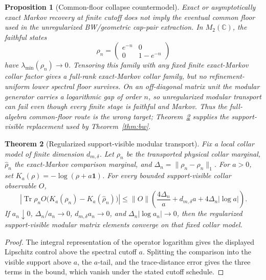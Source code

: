 \documentclass[11pt]{article}
\newtheorem{theorem}{Theorem}[section]
\newtheorem{proposition}[theorem]{Proposition}
\begin{document}
\begin{proposition}[Common-floor collapse countermodel]\label{prop:commonfloor-collapse}
Exact or asymptotically exact Markov recovery at finite cutoff does not imply the eventual common floor used in the unregularized BW/geometric cap-pair extraction. In \(M_2(\mathbb C)\), the faithful states
\[
\rho_n=\begin{pmatrix}e^{-n}&0\\0&1-e^{-n}\end{pmatrix}
\]
have \(\lambda_{\min}(\rho_n)\to0\). Tensoring this family with any fixed finite exact-Markov collar factor gives a full-rank exact-Markov collar family, but no refinement-uniform lower spectral floor survives. On an off-diagonal matrix unit the modular generator carries a logarithmic gap of order \(n\), so unregularized modular transport can fail even though every finite stage is faithful and Markov. Thus the full-algebra common-floor route is the wrong target; Theorem~\ref{thm:regularized-modular-transport} supplies the support-visible replacement used by Theorem~\ref{thm:bw}.
\end{proposition}

\begin{theorem}[Regularized support-visible modular transport]\label{thm:regularized-modular-transport}
Fix a local collar model of finite dimension \(d_{m,\delta}\). Let \(\rho_n\) be the transported physical collar marginal, \(\widehat\rho_n\) the exact-Markov comparison marginal, and \(\Delta_n=\|\rho_n-\widehat\rho_n\|_1\). For \(a>0\), set \(K_a(\rho)=-\log(\rho+a\mathbf 1)\). For every bounded support-visible collar observable \(O\),
\[
\left|\operatorname{Tr}\rho_n O\bigl(K_a(\rho_n)-K_a(\widehat\rho_n)\bigr)\right|
\le
\|O\|\left(\frac{4\Delta_n}{a}+d_{m,\delta}a+4\Delta_n|\log a|\right).
\]
If \(a_n\downarrow0\), \(\Delta_n/a_n\to0\), \(d_{m,\delta}a_n\to0\), and \(\Delta_n|\log a_n|\to0\), then the regularized support-visible modular matrix elements converge on that fixed collar model.
\end{theorem}

\begin{proof}
The integral representation of the operator logarithm gives the displayed Lipschitz control above the spectral cutoff \(a\). Splitting the comparison into the visible support above \(a\), the \(a\)-tail, and the trace-distance error gives the three terms in the bound, which vanish under the stated cutoff schedule.
\end{proof}
\end{document}
